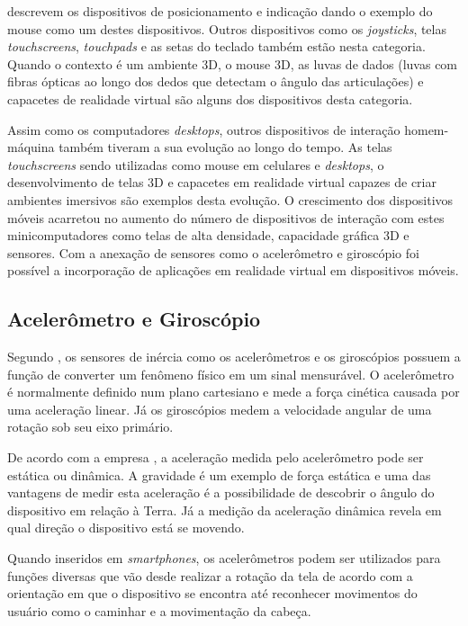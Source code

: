  descrevem os dispositivos de posicionamento e indicação dando o exemplo do mouse como um destes dispositivos. Outros dispositivos como os \textit{joysticks}, telas \textit{touchscreens}, \textit{touchpads} e as setas do teclado também estão nesta categoria.  Quando o contexto é um ambiente 3D, o mouse 3D, as luvas de dados (luvas com fibras ópticas ao longo dos dedos que detectam o ângulo das articulações) e capacetes de realidade virtual são alguns dos dispositivos desta categoria. 

Assim como os computadores \textit{desktops}, outros dispositivos de interação homem-máquina também tiveram a sua evolução ao longo do tempo. As telas \textit{touchscreens} sendo utilizadas como mouse em celulares e \textit{desktops}, o desenvolvimento de telas 3D e capacetes em realidade virtual capazes de criar ambientes imersivos são exemplos desta evolução. O crescimento dos dispositivos móveis acarretou no aumento do número de dispositivos de interação com estes minicomputadores como telas de alta densidade, capacidade gráfica 3D e sensores. Com a anexação de sensores como o acelerômetro e giroscópio foi possível a incorporação de aplicações em realidade virtual em dispositivos móveis.

\subsection{Acelerômetro e Giroscópio}
\label{ss.acelerometrogiroscopio}

Segundo , os sensores de inércia como os acelerômetros e os giroscópios possuem a função de converter um fenômeno físico em um sinal mensurável. O acelerômetro é normalmente definido num plano cartesiano e mede a força cinética causada por uma aceleração linear. Já os giroscópios medem a velocidade angular de uma rotação sob seu eixo primário.

De acordo com a empresa , a aceleração medida pelo acelerômetro pode ser estática ou dinâmica. A gravidade é um exemplo de força estática e uma das vantagens de medir esta aceleração é a possibilidade de descobrir o ângulo do dispositivo em relação à Terra. Já a medição da aceleração dinâmica revela em qual direção o dispositivo está se movendo. 

Quando inseridos em \textit{smartphones}, os acelerômetros podem ser utilizados para funções diversas que vão desde realizar a rotação da tela de acordo com a orientação em que o dispositivo se encontra até reconhecer movimentos do usuário como o caminhar e a movimentação da cabeça. 

